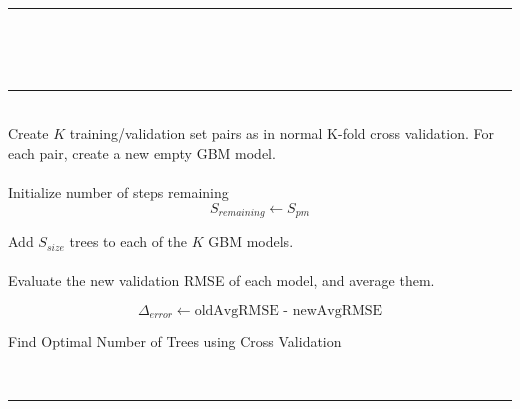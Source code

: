 \documentclass[9pt, conference]{IEEEtran}
\begin{document}
\begin{algorithm}[]
	\hspace{1 mm} \\\hrule\hspace{1 mm} \\
	
	\hspace{1 mm} \\\hrule\hspace{1 mm} \\
	
	Create \(K\) training/validation set pairs as in normal K-fold cross validation. For each pair, create a new empty GBM model. \\
	\hspace{1 mm} \\
	Initialize number of steps remaining
	\[
	S_{remaining} \leftarrow S_{pm}
	\]
	
	{
		Add \(S_{size}\) trees to each of the \(K\) GBM models.
		\hspace{1 mm} \\\hspace{1 mm} \\
		
		Evaluate the new validation RMSE of each model, and average them.
		
		\[
		\Delta_{error} \leftarrow \text{oldAvgRMSE - newAvgRMSE}
		\]
		
	}
	\caption{Find Optimal Number of Trees using Cross Validation}
	\hspace{1 mm} \\\hrule\hspace{1 mm} \\\hspace{1 mm} \\
	\label{alg:OptNumOfTrees}
\end{algorithm}
\end{document}
